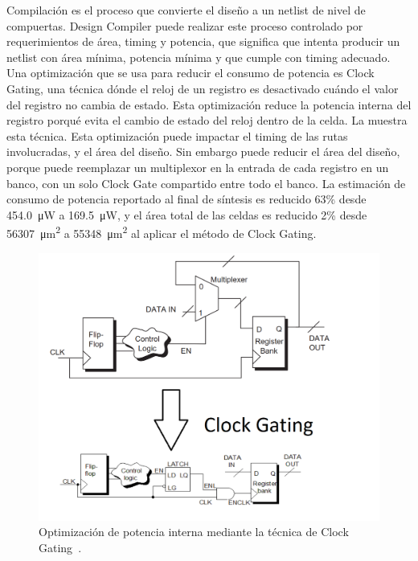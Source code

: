 \documentclass[a4paper, twoside, 11pt]{report}
\begin{document}
Compilación es el proceso que convierte el diseño a un netlist de nivel de compuertas. Design Compiler puede realizar este proceso controlado por requerimientos de área, timing y potencia, que significa que intenta producir un netlist con área mínima, potencia mínima y que cumple con timing adecuado. Una optimización que se usa para reducir el consumo de potencia es Clock Gating, una técnica dónde el reloj de un registro es desactivado cuándo el valor del registro no cambia de estado. Esta optimización reduce la potencia interna del registro porqué evita el cambio de estado del reloj dentro de la celda. La  muestra esta técnica. Esta optimización puede impactar el timing de las rutas involucradas, y el área del diseño. Sin embargo puede reducir el área del diseño, porque puede reemplazar un multiplexor en la entrada de cada registro en un banco, con un solo Clock Gate compartido entre todo el banco. La estimación de consumo de potencia reportado al final de síntesis es reducido 63\% desde \SI{454.0}{\micro\watt} a \SI{169.5}{\micro\watt}, y el área total de las celdas es reducido 2\% desde \SI{56307}{\micro\meter\squared} a \SI{55348}{\micro\meter\squared} al aplicar el método de Clock Gating. 

\begin{figure}[htb]
  \centering
  \includegraphics[width=1.0\textwidth]{./img/clock_gating}
  \caption{Optimización de potencia interna mediante la técnica de Clock Gating~\cite[modificaciones mías]{power_compiler_ug}.}
  \label{fig:clock_gating}
\end{figure}
\end{document}
